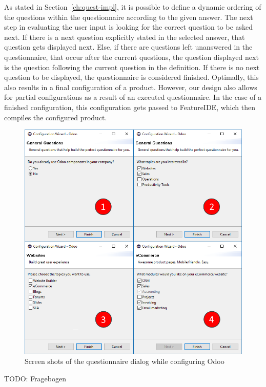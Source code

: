 As stated in Section~\ref{ch:quest-impl}, it is possible to define a dynamic ordering of the questions within the questionnaire according to the given answer. The next step in evaluating the user input is looking for the correct question to be asked next. If there is a next question explicitly stated in the selected answer, that question gets displayed next. Else, if there are questions left unanswered in the questionnaire, that occur after the current questions, the question displayed next is the question following the current question in the definition. If there is no next question to be displayed, the questionnaire is considered finished. Optimally, this also results in a final configuration of a product. However, our design also allows for partial configurations as a result of an executed questionnaire. In the case of a finished configuration, this configuration gets passed to FeatureIDE, which then compiles the configured product.


\begin{figure}
	\includegraphics[width=\columnwidth]{img/img-screenshots.png}
	\caption{Screen shots of the questionnaire dialog while configuring Odoo}
	\label{img-screenshots}
\end{figure}

{\color{red}TODO: Fragebogen}


